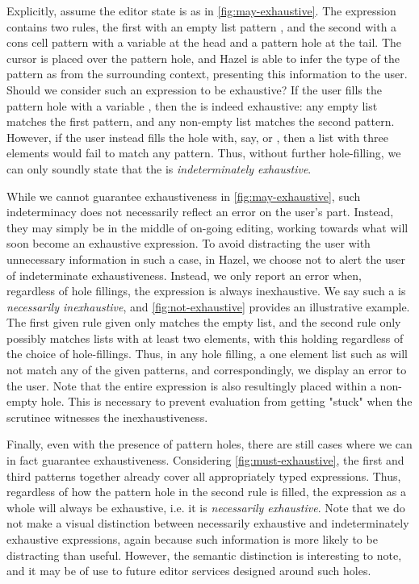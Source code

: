 Explicitly, assume the editor state is as in \autoref{fig:may-exhaustive}. The  expression contains two rules, the first with an empty list pattern \li{[]}, and the second with a cons cell pattern \li{::} with a variable  at the head and a pattern hole at the tail. The cursor is placed over the pattern hole, and Hazel is able to infer the type of the pattern as \li{[Int]} from the surrounding context, presenting this information to the user. Should we consider such an expression to be exhaustive? If the user fills the pattern hole with a variable , then the  is indeed exhaustive: any empty list matches the first pattern, and any non-empty list matches the second pattern. However, if the user instead fills the hole with, say, \li{[]} or , then a list with three elements would fail to match any pattern. Thus, without further hole-filling, we can only soundly state that the  is \emph{indeterminately exhaustive}.

While we cannot guarantee exhaustiveness in \autoref{fig:may-exhaustive}, such indeterminacy does not necessarily reflect an error on the user's part. Instead, they may simply be in the middle of on-going editing, working towards what will soon become an exhaustive expression. To avoid distracting the user with unnecessary information in such a case, in Hazel, we choose not to alert the user of indeterminate exhaustiveness. Instead, we only report an error when, regardless of hole fillings, the expression is always inexhaustive. We say such a  is \emph{necessarily inexhaustive}, and \autoref{fig:not-exhaustive} provides an illustrative example. The first given rule given only matches the empty list, and the second rule only possibly matches lists with at least two elements, with this holding regardless of the choice of hole-fillings. Thus, in any hole filling, a one element list such as  will not match any of the given patterns, and correspondingly, we display an error to the user. Note that the entire  expression is also resultingly placed within a non-empty hole. This is necessary to prevent evaluation from getting "stuck" when the scrutinee witnesses the inexhaustiveness.

Finally, even with the presence of pattern holes, there are still cases where we can in fact guarantee exhaustiveness. Considering \autoref{fig:must-exhaustive}, the first and third patterns together already cover all appropriately typed expressions. Thus, regardless of how the pattern hole in the second rule is filled, the  expression as a whole will always be exhaustive, i.e. it is \emph{necessarily exhaustive}. Note that we do not make a visual distinction between necessarily exhaustive and indeterminately exhaustive expressions, again because such information is more likely to be distracting than useful. However, the semantic distinction is interesting to note, and it may be of use to future editor services designed around such holes. 

